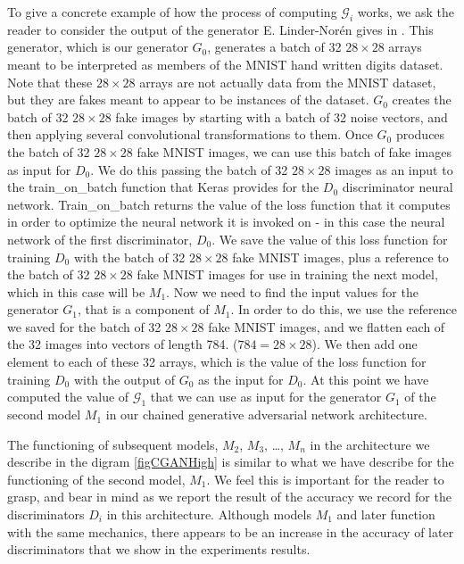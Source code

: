 \documentclass[conference]{IEEEtran}
\begin{document}
To give a concrete example of how the process of computing $\mathcal{G}_{i}$
works, we ask the reader to consider the output of the generator E.
Linder-Nor\'en gives in \cite{kerasdcgan}.  This generator, which is our
generator $G_{0}$, generates a batch of 32 $28\times28$ arrays meant to be
interpreted as members of the MNIST hand written digits \cite{mnist} dataset.  
Note that these $28 \times 28$ arrays are not actually data from the MNIST
dataset, but they are fakes meant to appear to be instances of the dataset.
$G_{0}$ creates the batch of 32 $28\times28$ fake images by starting with 
a batch of 32 noise vectors, and then applying several convolutional transformations 
to them.  Once $G_{0}$ produces the batch of 32 $28\times28$ fake MNIST images,
we can use this batch of fake images as input for $D_{0}$.  We do this passing
the batch of 32 $28\times28$ images as an input to the train\_on\_batch function
that Keras provides for the $D_{0}$ discriminator neural network. Train\_on\_batch
returns the value of the loss function that it computes in order to optimize the
neural network it is invoked on - in this case the neural network of the first
discriminator, $D_{0}$. We save the value of this loss function for training 
$D_{0}$ with the batch of 32 $28\times28$ fake MNIST images, plus a 
reference to the batch of 32 $28\times28$ fake MNIST images for use in training
the next model, which in this case will be $M_{1}$.  Now we need to find the
input values for the generator $G_{1}$, that is a component of $M_{1}$. In order
to do this, we use the reference we saved for the batch of 32 $28\times28$ fake
MNIST images, and we flatten each of the 32 images into vectors of length 784.
($784 = 28 \times 28$).  We then add one element to each of these 32 arrays,
which is the value of the loss function for training $D_{0}$ with the output of
$G_{0}$ as the input for $D_{0}$.  At this point we have computed the value of
$\mathcal{G}_{1}$ that we can use as input for the generator $G_{1}$ of the
second model $M_{1}$ in our chained generative adversarial network architecture.

The functioning of subsequent models, $M_{2}$, $M_{3}$, \ldots, $M_{n}$ in the
architecture we describe in the digram \ref{figCGANHigh} is similar to what we
have describe for the functioning of the second model, $M_{1}$. We feel this is
important for the reader to grasp, and bear in mind as we report the result of
the accuracy we record for the discriminators $D_{i}$ in this architecture.
Although models $M_{1}$ and later function with the same mechanics, there
appears to be an increase in the accuracy of later discriminators that we show
in the experiments results.
\end{document}
